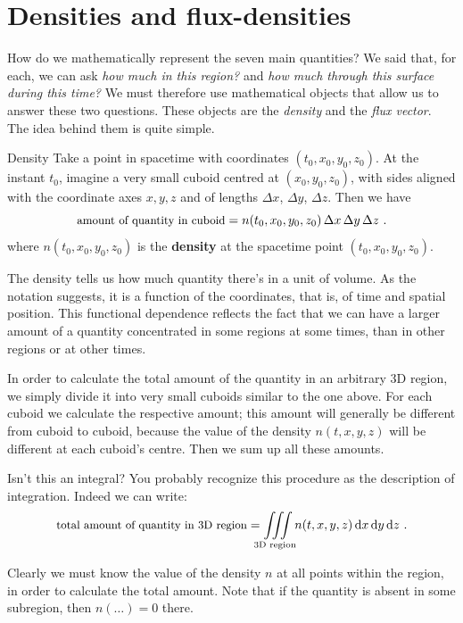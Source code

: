 \documentclass[a4paper,12pt,%
onecolumn,oneside,titlepage,%
british%
]{memoir}
\newcommand*{\di}{\mathrm{d}}%
\newcommand*{\incr}{\Delta}%
\renewcommand*{\|}[1][]{\nonscript\:#1\vert\nonscript\:\mathopen{}}
\newcommand*{\yti}{t_{0}}
\newcommand*{\yxi}{x_{0}}
\newcommand*{\yyi}{y_{0}}
\newcommand*{\yzi}{z_{0}}
\newcommand*{\Dx}{\incr x}
\newcommand*{\Dy}{\incr y}
\newcommand*{\Dz}{\incr z}
\begin{document}
\smallskip


\printpagenotes*
\clearpage
\chapter{Densities and flux-densities}
\label{ncha:density_fluxdensity}


How do we mathematically represent the seven main quantities? We said that, for each, we can ask \emph{how much in this region?} and \emph{how much through this surface during this time?} We must therefore use mathematical objects that allow us to answer these two questions. These objects are the \emph{density} and the \emph{flux vector}. The idea behind them is quite simple.


\begin{definition}{Density}
  Take a point in spacetime with coordinates $(\yti,\yxi,\yyi,\yzi)$. At the instant $\yti$, imagine a very small cuboid centred at $(\yxi,\yyi,\yzi)$, with sides aligned with the coordinate axes $x,y,z$ and of lengths $\Dx$, $\Dy$, $\Dz$. Then we have
  \begin{equation}
    \label{neq:density_expl}
    \text{\small amount of quantity in cuboid} =
    n(\yti,\yxi,\yyi,\yzi)\, \Dx\, \Dy\, \Dz \ .
  \end{equation}
  where $n(\yti,\yxi,\yyi,\yzi)$ is the \textbf{density} at the spacetime point $(\yti,\yxi,\yyi,\yzi)$.
\end{definition}
The density tells us how much quantity there's in a unit of volume. As the notation suggests, it is a function of the coordinates, that is, of time and spatial position. This functional dependence reflects the fact that we can have a larger amount of a quantity concentrated in some regions at some times, than in other regions or at other times.

In order to calculate the total amount of the quantity in an arbitrary 3D region, we simply divide it into very small cuboids similar to the one above. For each cuboid we calculate the respective amount; this amount will generally be different from cuboid to cuboid, because the value of the density $n(t,x,y,z)$ will be different at each cuboid's centre. Then we sum up all these amounts.

\begin{extra}{Isn't this an integral?}
  You probably recognize this procedure as the description of integration. Indeed we can write:
  \begin{equation}
    \label{neq:density_integral}
    \text{\small total amount of quantity in 3D region} =
    \iiint\limits_{\mathclap{\text{3D region}}}n(t,x,y,z)\, \di x\, \di y\, \di z \ .
  \end{equation}
\end{extra}
Clearly we must know the value of the density $n$ at all points within the region, in order to calculate the total amount. Note that if the quantity is absent in some subregion, then $n(\dotso)=0$ there.
\end{document}
